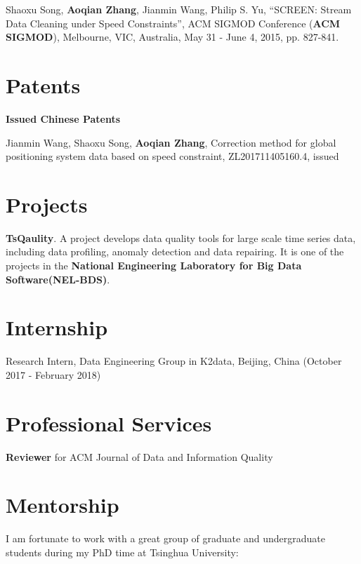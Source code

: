 \documentclass[margin]{cv}
\begin{document}
\begin{resume}
\begin{enumerate}[{[}1{]}]



\item Shaoxu Song, {\bf Aoqian Zhang}, Jianmin Wang, Philip S. Yu, ``SCREEN: Stream Data Cleaning under Speed Constraints'', ACM SIGMOD Conference ({\bf ACM SIGMOD}), Melbourne, VIC, Australia, May 31 - June 4, 2015, pp. 827-841.

\end{enumerate}

\section{\sc Patents}
{\bf Issued Chinese Patents}
\begin{enumerate}[{[}P1{]}]
\item Jianmin Wang, Shaoxu Song, {\bf Aoqian Zhang}, Correction method for global positioning system data based on speed constraint, ZL201711405160.4, issued

\end{enumerate}

\section{\sc Projects}
{\bf TsQaulity}. A project develops data quality tools for large scale time series data, including data profiling, anomaly detection and data repairing. It is one of the projects in the {\bf National Engineering Laboratory for Big Data Software(NEL-BDS)}.

\section{\sc Internship}
Research Intern, Data Engineering Group in K2data, Beijing, China (October 2017 - February 2018)

\section{\sc Professional Services}
\textbf{Reviewer} for ACM Journal of Data and Information Quality

\section{\sc Mentorship}
I am fortunate to work with a great group of graduate and undergraduate students during my PhD time at Tsinghua University:


\end{resume}
\end{document}
